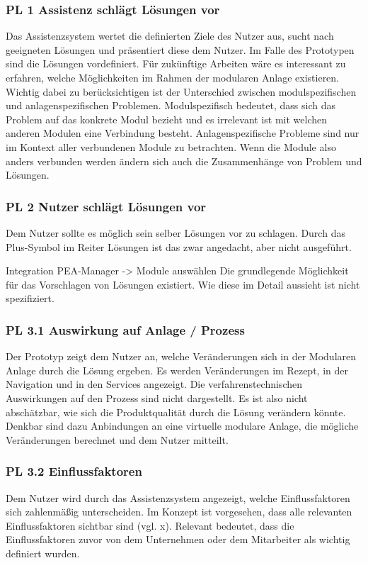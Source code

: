 \subsubsection*{PL 1 Assistenz schlägt Lösungen vor}
Das Assistenzsystem wertet die definierten Ziele des Nutzer aus, sucht nach geeigneten Lösungen und präsentiert diese dem Nutzer. Im Falle des Prototypen sind die Lösungen vordefiniert. Für zukünftige Arbeiten wäre es interessant zu erfahren, welche Möglichkeiten im Rahmen der modularen Anlage existieren. Wichtig dabei zu berücksichtigen ist der Unterschied zwischen modulspezifischen und anlagenspezifischen Problemen. Modulspezifisch bedeutet, dass sich das Problem auf das konkrete Modul bezieht und es irrelevant ist mit welchen anderen Modulen eine Verbindung besteht. Anlagenspezifische Probleme sind nur im Kontext aller verbundenen Module zu betrachten. Wenn die Module also anders verbunden werden ändern sich auch die Zusammenhänge von Problem und Lösungen.

\subsubsection*{PL 2 Nutzer schlägt Lösungen vor}
Dem Nutzer sollte es möglich sein selber Lösungen vor zu schlagen. Durch das Plus-Symbol im Reiter Lösungen ist das zwar angedacht, aber nicht ausgeführt. 

Integration PEA-Manager -> Module auswählen
Die grundlegende Möglichkeit für das Vorschlagen von Lösungen existiert. Wie diese im Detail aussieht ist nicht spezifiziert.

\subsubsection*{PL 3.1 Auswirkung auf Anlage / Prozess}
Der Prototyp zeigt dem Nutzer an, welche Veränderungen sich in der Modularen Anlage durch die Lösung ergeben. Es werden Veränderungen im Rezept, in der Navigation und in den Services angezeigt. Die verfahrenstechnischen Auswirkungen auf den Prozess sind nicht dargestellt. Es ist also nicht abschätzbar, wie sich die Produktqualität durch die Lösung verändern könnte. Denkbar sind dazu Anbindungen an eine virtuelle modulare Anlage, die mögliche Veränderungen berechnet und dem Nutzer mitteilt.

\subsubsection*{PL 3.2 Einflussfaktoren}
Dem Nutzer wird durch das Assistenzsystem angezeigt, welche Einflussfaktoren sich zahlenmäßig unterscheiden. Im Konzept ist vorgesehen, dass alle relevanten Einflussfaktoren sichtbar sind (vgl. x). Relevant bedeutet, dass die Einflussfaktoren zuvor von dem Unternehmen oder dem Mitarbeiter als wichtig definiert wurden.

